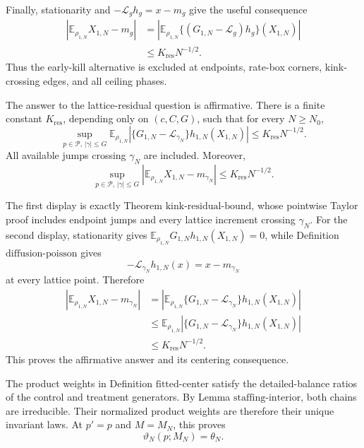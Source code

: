 Finally, stationarity and \(-\mathcal L_gh_g=x-m_g\) give the useful consequence
\[
 \begin{split}
 \left|\mathbb E_{\rho_{1,N}}X_{1,N}-m_g\right|
 &=\left|\mathbb E_{\rho_{1,N}}
   \{(G_{1,N}-\mathcal L_g)h_g\}(X_{1,N})\right|\\
 &\leq K_{\mathrm{res}}N^{-1/2}.                              \tag{18}
 \end{split}
\]
Thus the early-kill alternative is excluded at endpoints, rate-box corners, kink-crossing edges, and all ceiling phases.

The answer to the lattice-residual question is affirmative.  There is a finite constant \(K_{\mathrm{res}}\), depending only on \((c,C,G)\), such that for every \(N\geq N_0\),
\[
 \sup_{p\in\mathcal P,\,|\gamma|\leq G}
 \mathbb E_{\rho_{1,N}}
 \left|\{G_{1,N}-\mathcal L_{\gamma_N}\}
 h_{1,N}(X_{1,N})\right|
 \leq K_{\mathrm{res}}N^{-1/2}.
\]
All available jumps crossing \(\gamma_N\) are included.  Moreover,
\[
 \sup_{p\in\mathcal P,\,|\gamma|\leq G}
 \left|\mathbb E_{\rho_{1,N}}X_{1,N}-m_{\gamma_N}\right|
 \leq K_{\mathrm{res}}N^{-1/2}.
\]

The first display is exactly Theorem \(\mathrm{kink\mbox{-}residual\mbox{-}bound}\), whose pointwise Taylor proof includes endpoint jumps and every lattice increment crossing \(\gamma_N\).  For the second display, stationarity gives \(\mathbb E_{\rho_{1,N}}G_{1,N}h_{1,N}(X_{1,N})=0\), while Definition \(\mathrm{diffusion\mbox{-}poisson}\) gives
\[
 -\mathcal L_{\gamma_N}h_{1,N}(x)=x-m_{\gamma_N}
\]
at every lattice point.  Therefore
\[
 \begin{split}
 \left|\mathbb E_{\rho_{1,N}}X_{1,N}-m_{\gamma_N}\right|
 &=\left|\mathbb E_{\rho_{1,N}}
 \{G_{1,N}-\mathcal L_{\gamma_N}\}h_{1,N}(X_{1,N})\right|\\
 &\leq\mathbb E_{\rho_{1,N}}
 \left|\{G_{1,N}-\mathcal L_{\gamma_N}\}h_{1,N}(X_{1,N})\right|\\
 &\leq K_{\mathrm{res}}N^{-1/2}.
 \end{split}
\]
This proves the affirmative answer and its centering consequence.

The product weights in Definition \(\mathrm{fitted\mbox{-}center}\) satisfy the detailed-balance ratios of the control and treatment generators.  By Lemma \(\mathrm{staffing\mbox{-}interior}\), both chains are irreducible.  Their normalized product weights are therefore their unique invariant laws.  At \(p'=p\) and \(M=M_N\), this proves
\[
 \vartheta_N(p;M_N)=\theta_N.                                 \tag{1}
\]

